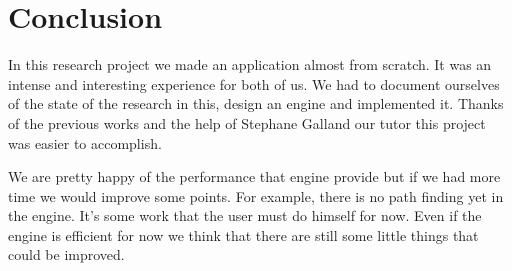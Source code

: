 \documentclass[a4paper,10pt]{book}
\begin{document}
\chapter {Conclusion}

In this research project we made an application almost from scratch. It was an intense and interesting experience for both of us. We had to document ourselves of the state of the research in this, design an engine and implemented it. Thanks of the previous works and the help of Stephane Galland our tutor this project was easier to accomplish. 

We are pretty happy of the performance that engine provide but if we had more time we would improve some points. For example, there is no path finding yet in the engine. It's some work that the user must do himself for now. Even if the engine is efficient for now we think that there are still some little things that could be improved.
\end{document}
